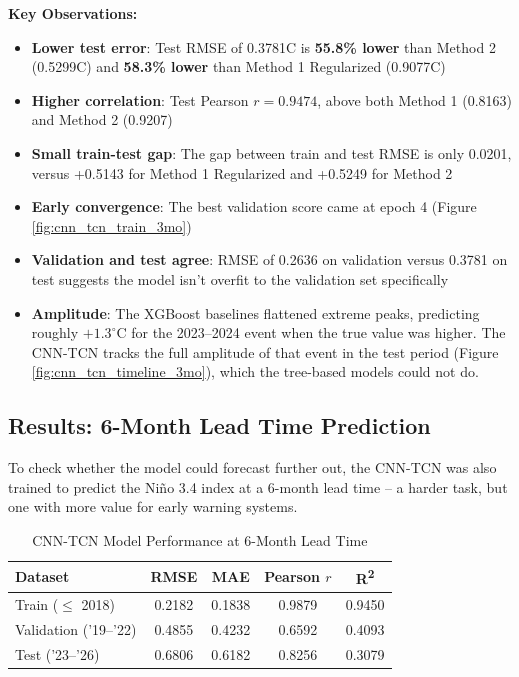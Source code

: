 \textbf{Key Observations:}
\begin{itemize}
    \item \textbf{Lower test error}: Test RMSE of 0.3781\degree C is \textbf{55.8\% lower} than Method 2 (0.5299\degree C) and \textbf{58.3\% lower} than Method 1 Regularized (0.9077\degree C)
    \item \textbf{Higher correlation}: Test Pearson $r = 0.9474$, above both Method 1 (0.8163) and Method 2 (0.9207)
    \item \textbf{Small train-test gap}: The gap between train and test RMSE is only 0.0201, versus +0.5143 for Method 1 Regularized and +0.5249 for Method 2
    \item \textbf{Early convergence}: The best validation score came at epoch 4 (Figure \ref{fig:cnn_tcn_train_3mo})
    \item \textbf{Validation and test agree}: RMSE of 0.2636 on validation versus 0.3781 on test suggests the model isn't overfit to the validation set specifically
    \item \textbf{Amplitude}: The XGBoost baselines flattened extreme peaks, predicting roughly $+1.3^{\circ}$C for the 2023--2024 event when the true value was higher. The CNN-TCN tracks the full amplitude of that event in the test period (Figure \ref{fig:cnn_tcn_timeline_3mo}), which the tree-based models could not do.
\end{itemize}

\subsection{Results: 6-Month Lead Time Prediction}
To check whether the model could forecast further out, the CNN-TCN was also trained to predict the Ni\~{n}o 3.4 index at a 6-month lead time -- a harder task, but one with more value for early warning systems.

\begin{table}[H]
\centering
\caption{CNN-TCN Model Performance at 6-Month Lead Time}
\label{tab:cnn_tcn_6mo}
\renewcommand{\arraystretch}{1.2}
\begin{tabular}{|l|c|c|c|c|}
\hline
\textbf{Dataset} & \textbf{RMSE} & \textbf{MAE} & \textbf{Pearson $r$} & \textbf{R\textsuperscript{2}} \\
\hline
Train ($\leq$ 2018) & 0.2182 & 0.1838 & 0.9879 & 0.9450 \\
\hline
Validation ('19--'22) & 0.4855 & 0.4232 & 0.6592 & 0.4093 \\
\hline
Test ('23--'26) & 0.6806 & 0.6182 & 0.8256 & 0.3079 \\
\hline
\end{tabular}
\end{table}

